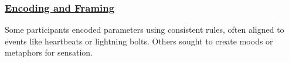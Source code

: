 %    
%
%    

\subsubsection{\underline{Encoding and Framing}}
    Some participants encoded parameters using consistent rules, often aligned to events like heartbeats or lightning bolts.
    Others sought to create moods or metaphors for sensation.
    
